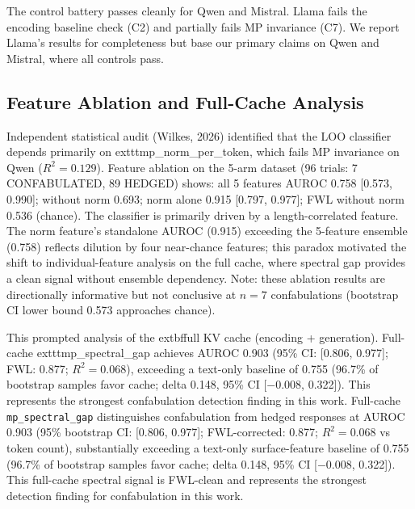 The control battery passes cleanly for Qwen and Mistral. Llama fails the
encoding baseline check (C2) and partially fails MP invariance (C7). We
report Llama's results for completeness but base our primary claims on
Qwen and Mistral, where all controls pass.

\subsection{Feature Ablation and Full-Cache Analysis}
\label{sec:ablation}

Independent statistical audit (Wilkes, 2026) identified that the LOO
classifier depends primarily on 	exttt{mp\_norm\_per\_token},
which fails MP invariance on Qwen ($R^2 = 0.129$). Feature ablation
on the 5-arm dataset (96 trials: 7 CONFABULATED, 89 HEDGED) shows:
all 5 features AUROC 0.758 [0.573, 0.990]; without norm 0.693;
norm alone 0.915 [0.797, 0.977]; FWL without norm 0.536 (chance).
The classifier is primarily driven by a length-correlated feature.
The norm feature's standalone AUROC (0.915) exceeding the 5-feature
ensemble (0.758) reflects dilution by four near-chance features; this
paradox motivated the shift to individual-feature analysis on the full
cache, where spectral gap provides a clean signal without ensemble
dependency. Note: these ablation results are directionally informative
but not conclusive at $n = 7$ confabulations (bootstrap CI lower bound
0.573 approaches chance).

This prompted analysis of the 	extbf{full KV cache}
(encoding + generation). Full-cache 	exttt{mp\_spectral\_gap}
achieves AUROC 0.903 (95\% CI: [0.806, 0.977]; FWL: 0.877;
$R^2 = 0.068$), exceeding a text-only baseline of 0.755
(96.7\% of bootstrap samples favor cache; delta 0.148,
95\% CI [$-$0.008, 0.322]). This represents the strongest
confabulation detection finding in this work.
Full-cache \texttt{mp\_spectral\_gap} distinguishes confabulation from
hedged responses at AUROC 0.903 (95\% bootstrap CI: [0.806, 0.977];
FWL-corrected: 0.877; $R^2 = 0.068$ vs token count), substantially
exceeding a text-only surface-feature baseline of 0.755 (96.7\% of
bootstrap samples favor cache; delta 0.148, 95\% CI [$-$0.008, 0.322]).
This full-cache spectral signal is FWL-clean and represents the
strongest detection finding for confabulation in this work.
